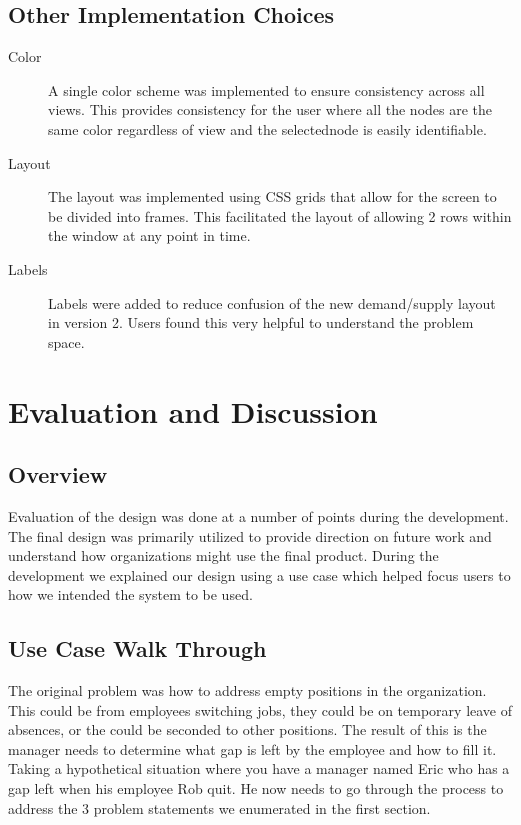 \message{ !name(FinalPaper.tex)}\documentclass[journal]{vgtc}                %
\begin{document}
\subsection{Other Implementation Choices}
\begin{description}
  
\item[Color] A single color scheme was implemented to ensure consistency across all views.  This provides consistency for the user where all the nodes are the same color regardless of view and the selectednode is easily identifiable.
  
\item[Layout] The layout was implemented using CSS grids that allow for the screen to be divided into frames.  This facilitated the layout of allowing 2 rows within the window at any point in time.
  
\item [Labels]Labels were added to reduce confusion of the new demand/supply layout in version 2.  Users found this very helpful to understand the problem space.
\end{description}


\section{Evaluation and Discussion}
\label{sec:evaldiscuss}

\subsection{Overview}
Evaluation of the design was done at a number of points during the development.  The final design was primarily utilized to provide direction on future work and understand how organizations might use the final product.  During the development we explained our design using a use case which helped focus users to how we intended the system to be used.

\subsection{Use Case Walk Through}
The original problem was how to address empty positions in the organization.  This could be from employees switching jobs, they could be on temporary leave of absences, or the could be seconded to other positions.  The result of this is the manager needs to determine what gap is left by the employee and how to fill it.  Taking a hypothetical situation where you have a manager named Eric who has a gap left when his employee Rob quit.  He now needs to go through the process to address the 3 problem statements we enumerated in the first section.
\end{document}

